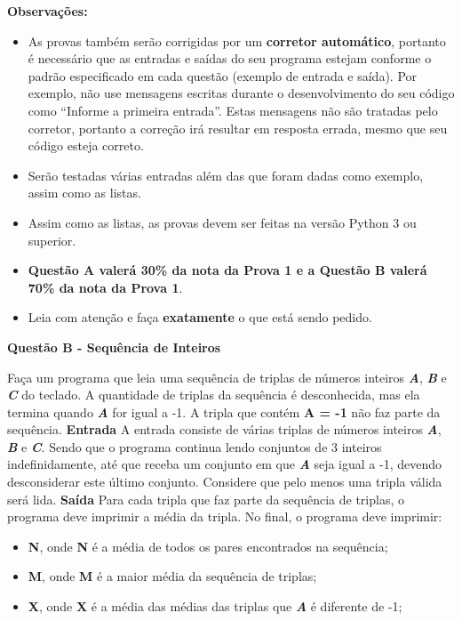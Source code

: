 \documentclass[a4paper, 12pt]{article}
\begin{document}
\textbf{{\large Observações:}}
\begin{itemize}
	\item As provas também serão corrigidas por um \textbf{corretor automático}, portanto é necessário que as entradas e saídas do seu programa estejam conforme o padrão especificado em cada questão (exemplo de entrada e saída). Por exemplo, não use mensagens escritas durante o desenvolvimento do seu código como “Informe a primeira entrada”. Estas mensagens não são tratadas pelo corretor, portanto a correção irá resultar em resposta errada, mesmo que seu código esteja correto.
	\item Serão testadas várias entradas além das que foram dadas como exemplo, assim como as listas.
	\item Assim como as listas, as provas devem ser feitas na versão Python 3 ou superior.
	\item \textbf{Questão A valerá 30\% da nota da Prova 1 e a Questão B valerá 70\% da nota da Prova 1}.
	\item Leia com atenção e faça \textbf{exatamente} o que está sendo pedido.
\end{itemize}
\newpage %
\begin{center}
\textbf{{\Large Questão B - Sequência de Inteiros}}
\end{center}
\vspace{5pt}
Faça um programa que leia uma sequência de triplas de números inteiros \textbf{\textit{A}}, \textbf{\textit{B}} e \textbf{\textit{C}} do teclado. A quantidade de triplas da sequência é desconhecida, mas ela termina quando \textbf{\textit{A}} for igual a -1. A tripla que contém \textbf{A = -1} não faz parte da sequência.
\newline \newline
\textbf{{\large Entrada}} \newline
A entrada consiste de várias triplas de números inteiros  \textbf{\textit{A}}, \textbf{\textit{B}} e \textbf{\textit{C}}. Sendo que o programa continua lendo conjuntos de 3 inteiros indefinidamente, até que receba um conjunto em que \textbf{\textit{A}} seja igual a -1, devendo desconsiderar este último conjunto. Considere que pelo menos uma tripla válida será lida.
\newline \newline
\textbf{{\large Saída}} \newline
Para cada tripla que faz parte da sequência de triplas, o programa deve imprimir a média da tripla. No final, o programa deve imprimir:
\begin{itemize}
\item \textbf{N}, onde \textbf{N} é a média de todos os pares encontrados na sequência;
\item \textbf{M}, onde \textbf{M} é a maior média da sequência de triplas;
\item \textbf{X}, onde \textbf{X} é a média das médias das triplas que \textbf{\textit{A}} é diferente de -1;
\end{itemize}
\end{document}
